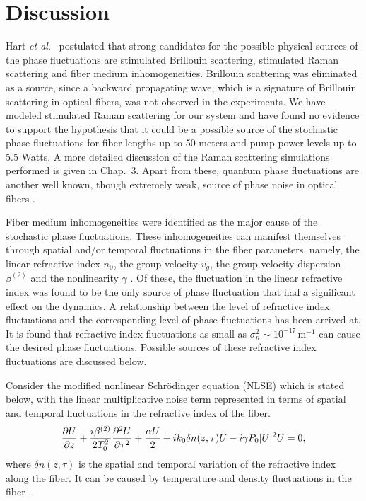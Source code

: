\section{Discussion}

Hart {\it et al}.\ \cite{hart1} postulated that strong candidates for the possible
physical sources of the phase fluctuations are stimulated Brillouin
scattering, stimulated Raman scattering and fiber medium inhomogeneities.
Brillouin scattering was eliminated as a source, since a backward propagating
wave, which is a signature of Brillouin scattering in optical fibers, was not
observed in the experiments. We have  modeled stimulated Raman scattering
\cite{Agrawal8, headley} for our system and have found no evidence to
support the hypothesis that it could be a possible source of the stochastic phase
fluctuations for fiber lengths up to 50 meters and pump power levels up to 5.5 Watts.
A more detailed discussion of the Raman scattering simulations performed is given in Chap.\ 3.
Apart from these, quantum phase fluctuations are another well
known, though extremely weak, source of phase noise in optical fibers
\cite{Agrawal2,perlmutter1}.

Fiber medium inhomogeneities were identified as the major cause of the
stochastic phase fluctuations. These inhomogeneities can manifest themselves
through spatial and/or temporal fluctuations in the fiber parameters, namely,
the linear refractive index $n_0$, the group velocity $v_g$, the group
velocity dispersion $\beta^{(2)}$ and the nonlinearity
$\gamma$ \cite{abdullaev}. Of these, the fluctuation in the linear refractive
index was found to be the only source of phase fluctuation that had a
significant effect on the dynamics. A relationship between the level of
refractive index fluctuations and the  corresponding level of phase
fluctuations has been arrived at. It is found that refractive index
fluctuations as small as $\sigma_n^2 \sim 10^{-17}$\,m$^{-1}$ can cause the
desired phase fluctuations. Possible sources of these refractive index
fluctuations are discussed below.

Consider the modified nonlinear Schr\"odinger equation (NLSE) which is
stated below, with the linear multiplicative noise term represented in terms of
spatial and temporal fluctuations in the refractive index of the fiber.
\begin{equation}
{\partial U \over \partial z} + {i\beta^{(2)} \over 2T_0^2} {\partial^2U \over \partial\tau^2} + {\alpha U \over 2} + ik_0 \delta n(z,\tau)U - i\gamma P_{0}|U|^2 U = 0 ,
\end{equation}
where $\delta n(z,\tau)$ is the spatial and temporal variation of the refractive
index along the fiber. It can be caused by temperature and density
fluctuations in the fiber \cite{glenn}.


